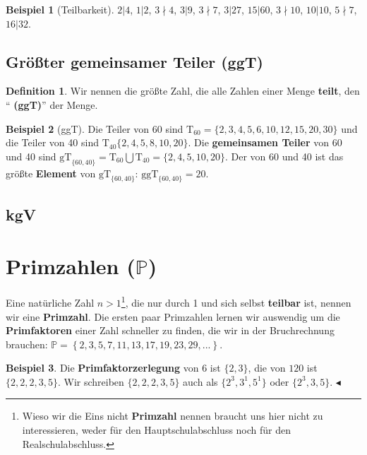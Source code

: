\documentclass[a4paper]{book}%
\newcommand{\topicend}{
      $\blacktriangleleft$
}
\theoremstyle{definition}
\newtheorem{definition}{Definition}
\newtheorem{beispiel}{Beispiel}
\begin{document}
\begin{beispiel}[Teilbarkeit]
    $2 | 4$, $1 | 2$, $3 \nmid 4$, $3 | 9$, $3 \nmid 7$, $3 | 27$, $15 | 60$, $3 \nmid 10$, $10 | 10$, $ 5 \nmid 7$, $16 | 32$.
\end{beispiel}


\subsection{Größter gemeinsamer Teiler (ggT)}

\begin{definition}
    Wir nennen die größte Zahl, die alle Zahlen einer Menge \textbf{teilt}, den \enquote{\textbf{ (ggT)}} der Menge.
\end{definition}

\begin{beispiel}[ggT]
    Die Teiler von 60 sind $\text{T}_{60} = \{2,3,4,5,6,10,12,15,20,30\}$ und die Teiler von 40 sind $\text{T}_{40}\{2,4,5,8,10,20\}$. Die \textbf{gemeinsamen Teiler} von 60 und 40 sind $\text{gT}_{\{60,40\}} = \text{T}_{60} \bigcup \text{T}_{40} = \{2,4,5,10,20\}$. Der \textbf{} von 60 und 40 ist das größte \textbf{Element} von $\text{gT}_{\{60,40\}}$: $\text{ggT}_{\{60,40\}}=20$.
\end{beispiel}


\subsection{kgV}



\section{Primzahlen ($\mathbb{P}$)}

Eine natürliche Zahl $n > 1$\footnote{Wieso wir die Eins nicht \textbf{Primzahl} nennen braucht uns hier nicht zu interessieren, weder für den Hauptschulabschluss noch für den Realschulabschluss.}, die nur durch 1 und sich selbst \textbf{teilbar} ist, nennen wir eine \textbf{Primzahl}. Die ersten paar Primzahlen lernen wir auswendig um die \textbf{Primfaktoren} einer Zahl schneller zu finden, die wir in der Bruchrechnung brauchen: $\mathbb{P}=\left\{2, 3, 5, 7, 11, 13, 17, 19, 23, 29, ...\right\}$.

\begin{beispiel}
    Die \textbf{Primfaktorzerlegung} von $6$ ist $\{2,3\}$, die von $120$ ist $\{2,2,2,3,5\}$. Wir schreiben $\{2,2,2,3,5\}$ auch als $\{2^3,3^1,5^1\}$ oder $\{2^3,3,5\}$.\topicend
\end{beispiel}
\end{document}
